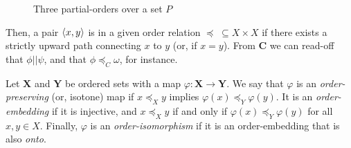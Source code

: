 \begin{figure}[H]
  \centering
  \small
  \begin{subfigure}{0.3\textwidth}
    \centering
    \label{subfigure:partial-order-a}
  \end{subfigure}%
  \begin{subfigure}{0.3\textwidth}
    \centering
    \label{subfigure:partial-order-b}
  \end{subfigure}%
  \begin{subfigure}{0.3\textwidth}
    \centering
    \label{subfigure:partial-order-c}
  \end{subfigure}%
  \caption{Three partial-orders over a set $P$}
  \label{figure:hasse-diagram}
\end{figure}

Then, a pair $\langle x,y \rangle$ is in a given order relation $\preceq \; \subseteq X \times X$ if there exists a strictly upward path connecting $x$ to $y$ (or, if $x = y$). From $\mathbf{C}$ we can read-off that $\phi || \psi$, and that $\phi \preceq_C \omega$, for instance.

\begin{definition}
  \label{definition:order-maps}
    
  Let $\mathbf{X}$ and $\mathbf{Y}$ be ordered sets with a map $\varphi : \mathbf{X} \to \mathbf{Y}$. We say that $\varphi$ is an \textit{order-preserving} (or, isotone) map if $x \preceq_X y$ implies $\varphi(x) \preceq_Y \varphi(y)$. It is an \textit{order-embedding} if it is injective, and $x \preceq_X y$ if and only if $\varphi(x) \preceq_Y \varphi(y)$ for all $x,y \in X$. Finally, $\varphi$ is an \textit{order-isomorphism} if it is an order-embedding that is also \textit{onto}.
\end{definition}

